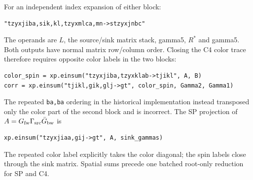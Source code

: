 \documentclass[11pt,a4paper]{article}
\newcommand{\walltag}[1]{\texttt{#1}}
\begin{document}
For an independent index expansion of either block:
\begin{verbatim}
"tzyxjiba,sik,kl,tzyxmlca,mn->stzyxjnbc"
\end{verbatim}
The operands are $L$, the source/sink matrix stack, gamma5, $R^*$ and gamma5.
Both outputs have normal matrix row/column order. Closing the C4 color trace
therefore requires opposite color labels in the two blocks:
\begin{verbatim}
color_spin = xp.einsum("tzyxjiba,tzyxklab->tjikl", A, B)
corr = xp.einsum("tjikl,gik,glj->gt", color_spin, Gamma2, Gamma1)
\end{verbatim}
The repeated \walltag{ba,ba} ordering in the historical implementation
instead transposed only the color part of the second block and is incorrect.
The SP projection of $A=G_{\rm fw}\Gamma_{\rm src}\bar G_{\rm bw}$ is
\begin{verbatim}
xp.einsum("tzyxjiaa,gij->gt", A, sink_gammas)
\end{verbatim}
The repeated color label explicitly takes the color diagonal; the spin
labels close through the sink matrix. Spatial sums precede one batched
root-only reduction for SP and C4.
\end{document}

